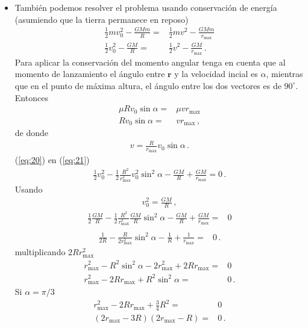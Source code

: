 \begin{itemize}
\item También podemos resolver el problema usando conservación de energía (asumiendo que la tierra permanece en reposo)
  \begin{align}
    \label{eq:21}
    \frac{1}{2}m v_0^2-\frac{GMm}{R}=&\frac{1}{2}mv^2-\frac{GMm}{r_{\text{max}}}\nonumber\\
    \frac{1}{2}v_0^2-\frac{GM}{R}=&\frac{1}{2}v^2-\frac{GM}{r_{\text{max}}}\,.
  \end{align}
Para aplicar la conservación del momento angular tenga en cuenta que al momento de lanzamiento el ángulo entre $\mathbf{r}$ y la velocidad incial es $\alpha$, mientras que en el punto de máxima altura, el ángulo entre los dos vectores es de $90^\circ$. Entonces
  \begin{align}
    \mu R v_0 \sin\alpha=&\mu v r_{\text{max}}\nonumber\\
     R v_0 \sin\alpha=&v r_{\text{max}}\,,
  \end{align}
de donde
\begin{align}
  \label{eq:20}
  v=\frac{R}{r_{\text{max}}}v_0 \sin\alpha\,.
\end{align}
(\ref{eq:20}) en (\ref{eq:21})
\begin{align}
  \frac{1}{2}v_0^2-\frac{1}{2}\frac{R^2}{r^2_{\text{max}}}v^2_0 \sin^2\alpha-\frac{GM}{R}+\frac{GM}{r_{\text{max}}}=0\,.
\end{align}
Usando
\begin{align}
  v_0^2=\frac{GM}{R}\,,
\end{align}
\begin{align}
    \frac{1}{2}\frac{GM}{R}-\frac{1}{2}\frac{R^2}{r^2_{\text{max}}}\frac{GM}{R} \sin^2\alpha-\frac{GM}{R}+\frac{GM}{r_{\text{max}}}=&0\nonumber\\
\end{align}
\begin{align}
      \frac{1}{2R}-\frac{R}{2r^2_{\text{max}}} \sin^2\alpha-\frac{1}{R}+\frac{1}{r_{\text{max}}}=&0\,.
\end{align}
multiplicando $2R r_{\text{max}}^2$ 
\begin{align}
 r_{\text{max}}^2-{R^2} \sin^2\alpha-2 r^2_{\text{max}}+2Rr_{\text{max}}=&0\nonumber\\
   r_{\text{max}}^2-2Rr_{\text{max}}+R^2 \sin^2\alpha=&0\,.
\end{align}
Si $\alpha=\pi/3$
\begin{align}
r_{\text{max}}^2-2Rr_{\text{max}}+\frac{3}{4}R^2 =&0\nonumber\\
(2r_{\text{max}}-3R)(2r_{\text{max}}-R)=&0\,.

\end{align}
\end{itemize}
